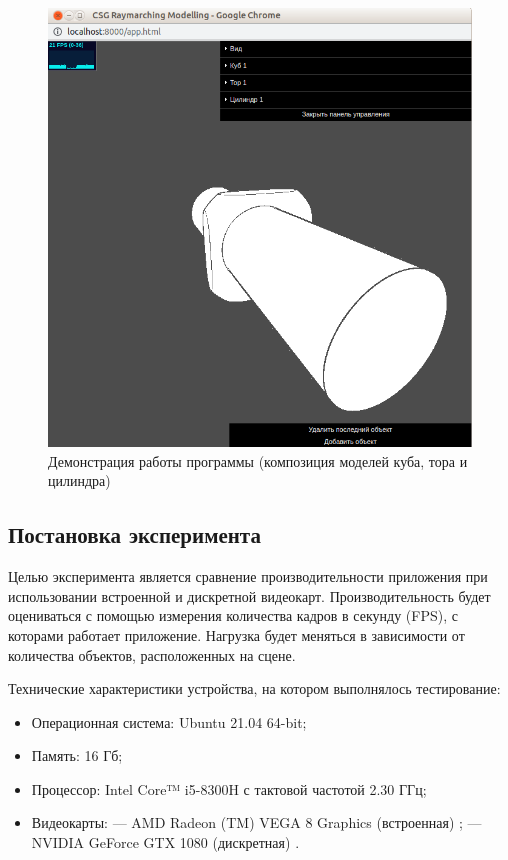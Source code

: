 \begin{figure}[h]
	\centering
	\captionsetup{justification=centering}
	\includegraphics[width=140mm]{img/example-2.png}
	\caption{Демонстрация  работы  программы  (композиция  моделей 
		куба, тора и цилиндра)}
	\label{fig:example-2}
\end{figure}

\subsection{Постановка эксперимента}

Целью эксперимента является сравнение производительности приложения при использовании встроенной и 
дискретной видеокарт.
Производительность будет оцениваться с помощью измерения количества кадров в секунду (FPS), с которами работает приложение.
Нагрузка будет меняться в зависимости от количества объектов, расположенных на сцене.  

\clearpage


Технические характеристики устройства, на котором выполнялось тестирование:

\begin{itemize}[label=---]
	\item Операционная система: Ubuntu 21.04 \cite{ubuntu} 64-bit;
	\item Память: 16 Гб;
	\item Процессор: Intel Core™ i5-8300H \cite{intel} с тактовой частотой  2.30 ГГц;
	\item Видеокарты: 
	\subitem--- AMD Radeon (TM) VEGA 8 Graphics (встроенная) \cite{amd-graphics};
	\subitem--- NVIDIA GeForce GTX 1080 (дискретная) \cite{nvidia-graphics}.
\end{itemize}

